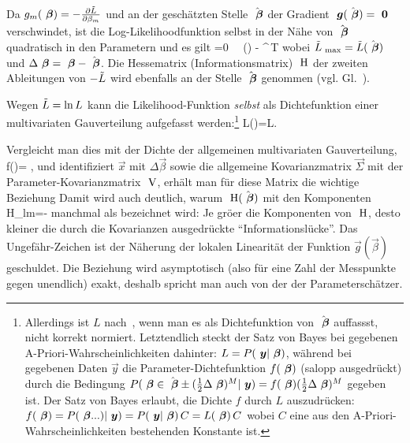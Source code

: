 \bi
\item Da $g_m({\mbox{ \boldmath {$\beta$}}})=-\frac{\partial \tilde{L}}{\partial \beta_m}$ und an der
  gesch\"atzten Stelle $\hat{{\mbox{ \boldmath {$\beta$}}}}$ der Gradient
  ${\mbox{ \boldmath {$g$}}}(\hat{{\mbox{ \boldmath {$\beta$}}}})={\mbox{ \boldmath {$0$}}}$ verschwindet, ist die
Log-Likeli\-hood\-funk\-tion selbst in der N\"ahe von $\hat{{\mbox{ \boldmath {$\beta$}}}}$ 
quadratisch in den Parametern und es gilt
\be
\label{logLquadrat}
\abl{\tilL}{\vecbeta}=0 \ \Rightarrow \ 
\tilL(\vec{\beta}) \approx \tilL{} - 
\Delta \vec{\beta}^{\,T} \cdot {} \cdot \Delta \vec{\beta}
\ee
wobei $\tilde{L}_{{\mbox{ {\scriptsize \hspace{-0.2ex}max}}}}=\tilde{L}(\hat{{\mbox{ \boldmath {$\beta$}}}})$ und
$\Delta {\mbox{ \boldmath {$\beta$}}}={\mbox{ \boldmath {$\beta$}}}-\hat{{\mbox{ \boldmath {$\beta$}}}}$. Die Hessematrix
(Informationsmatrix) ${\mbox{ \textsf\textbf{H}}}$ der zweiten Ableitungen von $-\tilde{L}$ 
wird ebenfalls an der Stelle $\hat{{\mbox{ \boldmath {$\beta$}}}}$ genommen
(vgl. Gl.~). 

\item Wegen $\tilde{L}=\ln L$ kann die Likelihood-Funktion \emph{selbst}
als Dichtefunktion  einer multivariaten Gau\3verteilung aufgefasst
werden:\footnote{Allerdings ist $L$ nach~\refkl{Lgauss}, wenn man es
  als Dichtefunktion von $\hat{{\mbox{ \boldmath {$\beta$}}}}$ 
auffassst, nicht korrekt normiert. Letztendlich steckt der Satz von
Bayes bei gegebenen A-Priori-Wahrscheinlichkeiten dahinter:
$L=P({\mbox{ \boldmath {$y$}}}|{\mbox{ \boldmath {$\beta$}}})$, w\"ahrend bei gegebenen Daten $\vec{y}$
die Parameter-Dichtefunktion $f({\mbox{ \boldmath {$\beta$}}})$ (salopp ausgedr\"uckt)
durch die Bedingung
$P({\mbox{ \boldmath {$\beta$}}} \in \hat{{\mbox{ \boldmath {$\beta$}}}} \pm (\frac{1}{2} \Delta
{\mbox{ \boldmath {$\beta$}}})^M|{\mbox{ \boldmath {$y$}}}) = f({\mbox{ \boldmath {$\beta$}}})(\frac{1}{2} \Delta {\mbox{ \boldmath {$\beta$}}})^M$ 
gegeben ist. Der Satz von Bayes erlaubt, die Dichte $f$ durch $L$
auszudr\"ucken:
$f({\mbox{ \boldmath {$\beta$}}})=P({\mbox{ \boldmath {$\beta$}}} ... )|{\mbox{ \boldmath {$y$}}})=P({\mbox{ \boldmath {$y$}}}|{\mbox{ \boldmath {$\beta$}}})\, C=L({\mbox{ \boldmath {$\beta$}}})\, C$
wobei $C$ eine aus den A-Priori-Wahrscheinlichkeiten
bestehenden Konstante ist.}
\be
\label{Lgauss}
L(\vec{\beta})=L\exp\left[ 
-\frac{1}{2} \left(\Delta \vec{\beta}^{\,T} \cdot \m{H} \cdot \Delta \vec{\beta}\right)
\right].
\ee

\item
Vergleicht man dies mit der Dichte der allgemeinen multivariaten
Gau\3verteilung,
\be
\label{fGaussMulti}
f()=
\exp{},
\ee
und identifiziert $\vec{x}$ mit $\Delta \vec{\beta}$ sowie die
allgemeine 
Kovarianzmatrix $\vec{\Sigma}$ mit der Para\-me\-ter-Kovarianzmatrix
${\mbox{ \textsf\textbf{V}}}$, erh\"alt man f\"ur diese Matrix die wichtige Beziehung
%
Damit wird auch deutlich, warum ${\mbox{ \textsf\textbf{H}}}(\hat{{\mbox{ \boldmath {$\beta$}}}})$ mit den
Komponenten
\be
\label{H-tilL}
H_{lm}=-
\ee
manchmal als  bezeichnet
wird: Je gr\"o\3er die Komponenten von ${\mbox{ \textsf\textbf{H}}}$, desto kleiner die
durch die Kovarianzen ausgedr\"uckte ``Informationsl\"ucke''.
Das Ungef\"ahr-Zeichen ist der N\"aherung der lokalen Linearit\"at der
Funktion $\vec{g}(\vec{\beta})$ geschuldet. Die Beziehung wird
asymptotisch (also f\"ur eine Zahl der Messpunkte gegen unendlich)
exakt, deshalb spricht man auch von der  der Parametersch\"atzer. 

